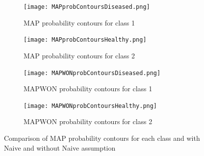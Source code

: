 \begin{figure}[h!] 
	\centering
	\begin{subfigure}[b]{.49\textwidth}
		\texttt{[image: MAPprobContoursDiseased.png]}
		\caption{MAP probability contours for class 1}
		\label{fig:cmapprob1}
	\end{subfigure}
	\begin{subfigure}[b]{.49\textwidth}
		\texttt{[image: MAPprobContoursHealthy.png]}
		\caption{MAP probability contours for class 2}
		\label{fig:model1}
	\end{subfigure}
	\begin{subfigure}[b]{.49\textwidth}
		\texttt{[image: MAPWONprobContoursDiseased.png]}
		\caption{MAPWON probability contours for class 1}
		\label{fig:model2}
	\end{subfigure}
	\begin{subfigure}[b]{.49\textwidth}
		\texttt{[image: MAPWONprobContoursHealthy.png]}
		\caption{MAPWON probability contours for class 2}
		\label{fig:model3}
	\end{subfigure}
	\caption{Comparison of MAP probability contours for each class and with Naive and without Naive assumption}
	\label{fig:CMAPprob}
\end{figure}


